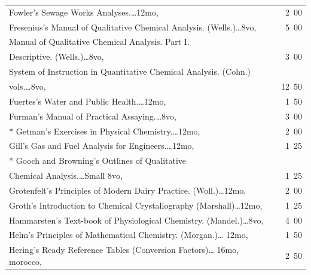 \documentclass[a4paper,12pt]{book}[2004/02/16]
\theoremstyle{ilemma}
\theoremstyle{itheorem}
\theoremstyle{iother}
\theoremstyle{icorollary}
\theoremstyle{numcorollary}
\theoremstyle{idefinition}
\begin{document}
\begin{longtable}{@{}l@{ }r@{}}
Fowler's Sewage Works Analyses.\dotfill\ldots 12mo, &2\ 00\\

Fresenius's Manual of Qualitative Chemical
Analysis. (Wells.)\dotfill\ldots 8vo, &5\ 00\\

\indent Manual of Qualitative Chemical Analysis. Part I.\\

\nopagebreak
\indent\indent Descriptive. (Wells.)\dotfill\ldots 8vo, &3\ 00\\

\indent System of Instruction in Quantitative Chemical Analysis. (Cohn.)\\

\nopagebreak
\indent\indent 2 vols.\dotfill\ldots 8vo, &12\ 50\\

Fuertes's Water and Public Health.\dotfill\ldots 12mo, &1\ 50\\

Furman's Manual of Practical Assaying.\dotfill\ldots 8vo, &3\ 00\\

* Getman's Exercises in Physical Chemistry.\dotfill\ldots 12mo, &2\ 00\\

Gill's Gas and Fuel Analysis for Engineers.\dotfill\ldots 12mo, &1\ 25\\

* Gooch and Browning's Outlines of Qualitative\\

\nopagebreak
\indent\indent Chemical Analysis.\dotfill\ldots Small 8vo, & 1\ 25\\

Grotenfelt's Principles of Modern Dairy
Practice. (Woll.)\dotfill\ldots 12mo, &2\ 00\\

Groth's Introduction to Chemical Crystallography
(Marshall)\dotfill\ldots 12mo, &1\ 25\\

Hammarsten's Text-book of Physiological
Chemistry. (Mandel.)\dotfill\ldots 8vo, &4\ 00\\

Helm's Principles of Mathematical Chemistry. (Morgan.)\dotfill\ldots
12mo, &1\ 50\\

Hering's Ready Reference Tables (Conversion Factors)\dotfill\ldots
16mo, morocco, &2\ 50\\


\end{longtable}
\end{document}
